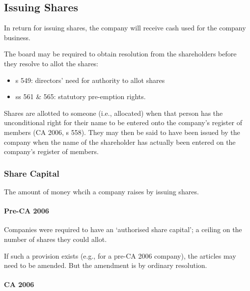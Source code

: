 \documentclass[
]{article}
\newenvironment{Shaded}{}{}
\newcommand{\NormalTok}[1]{#1}
\providecommand{\tightlist}{%
  \setlength{\itemsep}{0pt}\setlength{\parskip}{0pt}}
\begin{document}
\hypertarget{issuing-shares}{%
\subsection{Issuing Shares}\label{issuing-shares}}

In return for issuing shares, the company will receive cash used for the
company business.

The board may be required to obtain resolution from the shareholders
before they resolve to allot the shares:

\begin{itemize}
\tightlist
\item
  s 549: directors' need for authority to allot shares
\item
  ss 561 \& 565: statutory pre-emption rights.
\end{itemize}

Shares are allotted to someone (i.e., allocated) when that person has
the unconditional right for their name to be entered onto the company's
register of members (CA 2006, s 558). They may then be said to have been
issued by the company when the name of the shareholder has actually been
entered on the company's register of members.

\hypertarget{share-capital}{%
\subsubsection{Share Capital}\label{share-capital}}

\begin{Shaded}
\begin{Highlighting}[]
\NormalTok{The amount of money whcih a company raises by issuing shares.}
\end{Highlighting}
\end{Shaded}

\hypertarget{pre-ca-2006}{%
\paragraph{Pre-CA 2006}\label{pre-ca-2006}}

Companies were required to have an `authorised share capital'; a ceiling
on the number of shares they could allot.

If such a provision exists (e.g., for a pre-CA 2006 company), the
articles may need to be amended. But the amendment is by ordinary
resolution.

\hypertarget{ca-2006}{%
\paragraph{CA 2006}\label{ca-2006}}
\end{document}
